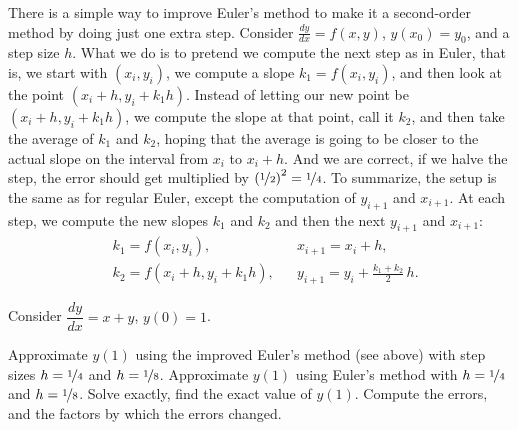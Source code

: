 There is a simple way to improve Euler's method to make it a
second-order method by doing just one extra step.
Consider $\frac{dy}{dx}=f(x,y)$, $y(x_0) = y_0$,
and a step size $h$.
What we do is to pretend we compute the next step as in Euler,
that is, we start with $(x_i,y_i)$, we compute a
slope $k_1 = f(x_i,y_i)$, and then look at the point $(x_i+h,y_i + k_1h)$.
Instead of letting our new point be $(x_i+h,y_i + k_1h)$, we compute
the slope at that point, call it $k_2$, and then take the average
of $k_1$ and $k_2$, hoping that the average is going to be closer to
the actual slope on the interval from $x_i$ to $x_i+h$.  And we are correct,
if we halve the step, the error should get multiplied by 
${(\nicefrac{1}{2})}^2 = \nicefrac{1}{4}$.
To summarize, the setup is the
same as for regular Euler, except
the computation of $y_{i+1}$ and $x_{i+1}$.
At each step, we compute the new slopes $k_1$ and $k_2$ and then the next
$y_{i+1}$ and $x_{i+1}$:
\begin{align*}
& k_1 = f(x_i,y_i) , & & 
x_{i+1} = x_i + h , \\
& k_2 = f(x_i + h,y_i + k_1h) ,
& & y_{i+1} = y_i + \frac{k_1+k_2}{2}\,h .
\end{align*}


\begin{exercise}
Consider $\dfrac{dy}{dx} = x+y$, $y(0)=1$.
\begin{tasks}
\task Approximate $y(1)$ using the improved Euler's method (see above) with
step sizes $h=\nicefrac{1}{4}$ and $h=\nicefrac{1}{8}$.
\task Approximate $y(1)$ using Euler's method with
$h=\nicefrac{1}{4}$ and $h=\nicefrac{1}{8}$.
\task Solve exactly, find the exact value of
$y(1)$.
\task Compute the errors, and the factors by which the errors changed.
\end{tasks}
\end{exercise}


